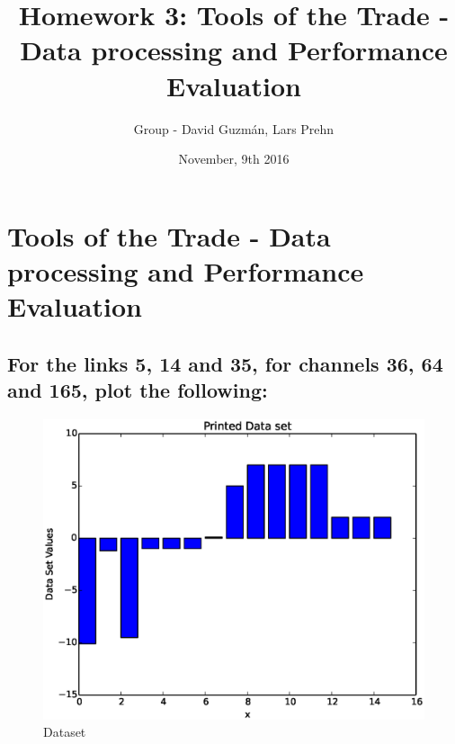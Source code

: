\documentclass [12 pt , a4paper ] {article}
\begin{document}
\title{\huge \textbf { Homework 3: Tools of the Trade - Data processing and Performance
Evaluation}}
\date { November, 9th 2016 }
\author { Group  - David Guzm\'an, Lars Prehn }
\maketitle
\tableofcontents{}
\newpage
\section{Tools of the Trade - Data processing and Performance
Evaluation}
\subsection{For the links 5, 14 and 35, for channels 36, 64 and 165, plot the following:}
\cite{schiller}
\begin{figure}[!ht]
  \centering
  \includegraphics[scale=0.2]{ecdf.eps}
  \caption{Dataset}
  \label{fig:Dataset}
\end{figure}


\printbibliography
\end{document}
